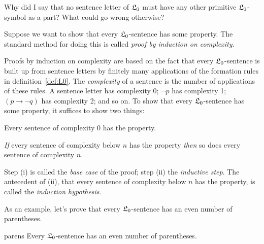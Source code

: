 


\begin{exercise}
  Why did I say that no sentence letter of $\mathfrak{L}_{0}$ must have
  any other primitive $\mathfrak{L}_{0}$-symbol as a part?
  What could go wrong otherwise?
\end{exercise}

Suppose we want to show that every $\mathfrak{L}_{0}$-sentence has some property.
The standard method for doing this is called \emph{proof by induction on complexity}.

Proofs by induction on complexity are based on the fact that
every $\mathfrak{L}_{0}$-sentence is built up from sentence letters
by finitely many applications of the formation rules in definition~\ref{def:L0}.
The \emph{complexity} of a sentence is the number of applications of these rules.
A sentence letter has complexity 0;
$\neg p$ has complexity 1;
$(p \to \neg q)$ has complexity 2;
and so on.
To show that every $\mathfrak{L}_{0}$-sentence has some property,
it suffices to show two things:
%
\begin{cenumerate}
  \item[(i)] Every sentence of complexity 0 has the property.
  \item[(ii)] \emph{If} every sentence of complexity below $n$ has the property \emph{then} so does every sentence of complexity $n$.
\end{cenumerate}
%
Step (i) is called the \emph{base case} of the proof;
step (ii) the \emph{inductive step}.
The antecedent of (ii),
that every sentence of complexity below $n$ has the property,
is called the \emph{induction hypothesis}.

As an example, let's prove that
every $\mathfrak{L}_{0}$-sentence has an even number of parentheses.

\begin{proposition}{}{parens}
  Every $\mathfrak{L}_{0}$-sentence has an even number of parentheses.
\end{proposition}

